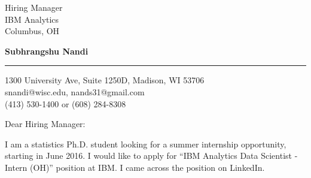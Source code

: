 \documentclass{letter} %
\begin{document}
\signature{Subhrangshu Nandi}           %
\longindentation=0pt                       %
\let\raggedleft\raggedright                %
 
 
\begin{letter}
{Hiring Manager \\
IBM Analytics \\
Columbus, OH
}



\begin{flushleft}
{\bf Subhrangshu Nandi}
\end{flushleft}
\medskip\hrule height 1pt
\begin{flushright}
\hfill 1300 University Ave, Suite 1250D, Madison, WI 53706 \\
\hfill snandi@wisc.edu, nands31@gmail.com\\
\hfill (413) 530-1400 or (608) 284-8308
\end{flushright} 
\vfill %

\opening{Dear Hiring Manager:} 
 
\noindent %
I am a statistics Ph.D. student looking for a summer internship opportunity, starting in June 2016. I would like to apply for ``IBM Analytics Data Scientist - Intern (OH)'' position at IBM. I came across the position on LinkedIn.
 

\end{letter}
\end{document}
